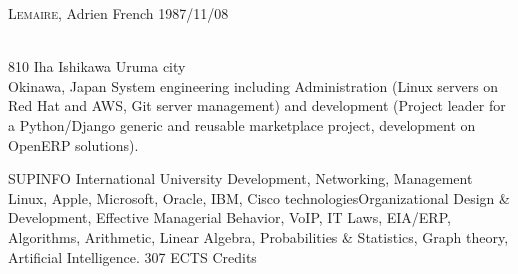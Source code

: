 \documentclass[english]{ecv}
\begin{document}
\begin{ecv}


   {\textsc{Lemaire}, Adrien}
 {}
                {French}
                {1987/11/08}


                {\\
                810 Iha Ishikawa Uruma city\\Okinawa, Japan}
%
        {System engineering including Administration (Linux servers on
          Red Hat and AWS, Git server management) and development
          (Project leader for a Python/Django generic and reusable
          marketplace project, development on OpenERP solutions).}


                {}
                {SUPINFO International University}
                {Development, Networking, Management}
                {Linux, Apple, Microsoft, Oracle, IBM, Cisco technologies\ecvNewLine Organizational Design \& Development, Effective Managerial
                Behavior, VoIP, IT Laws, EIA/ERP, Algorithms, Arithmetic, Linear
                Algebra, Probabilities \& Statistics, Graph theory, Artificial
                Intelligence.}
   {307 ECTS Credits}


\end{ecv}
\end{document}
